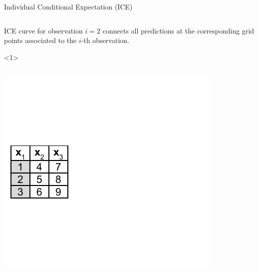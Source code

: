 \begin{vbframe}{Individual Conditional Expectation (ICE)}
\begin{onlyenv}
\begin{columns}[T]
\begin{column}{0.5\textwidth}
\end{column}
\end{columns}
\end{onlyenv}
ICE curve for observation $i=2$ connects all predictions at the corresponding grid points associated to the $i$-th observation.

\framebreak

\begin{onlyenv}<1>
  \vspace{1cm}
    \begin{columns}[T]
\begin{column}{0.5\textwidth}
\centering
\includegraphics[page=7, width=\textwidth]{figure_man/ice_pd_plot_demo}
\end{column}
\begin{column}{0.5\textwidth}
\vspace{0.3cm}


\end{column}
\end{columns}
\end{onlyenv}
\end{vbframe}
